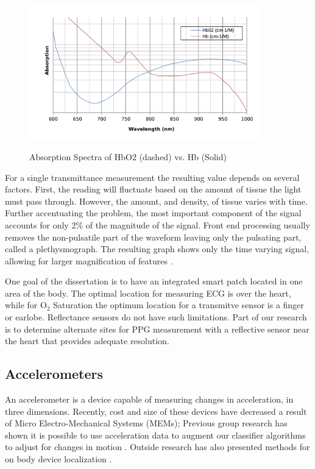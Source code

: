 \begin{figure}
	\begin{center}
		\label{fig:Hemoglobin}
		\includegraphics[scale=1,width=0.9\textwidth]{Images/hemoglobin.pdf} 
		\caption{Absorption Spectra of HbO2 (dashed) vs. Hb (Solid) }
	\end{center}
\end{figure}

For a single transmittance measurement the resulting value depends on several factors. First, the reading will fluctuate based on the amount of tissue the light must pass through. However, the amount, and density, of tissue varies with time. Further accentuating the problem, the most important component of the signal accounts for only 2\% of the magnitude of the signal. Front end processing usually removes the non-pulsatile part of the waveform leaving only the pulsating part, called a plethysmograph. The resulting graph shows only the time varying signal, allowing for larger magnification of features \cite{Jawahar2009}.

One goal of the dissertation is to have an integrated smart patch located in one area of the body. The optimal location for measuring ECG is over the heart, while for O$_2$ Saturation the optimum location for a transmitve sensor is a finger or earlobe. Reflectance sensors do not have such limitations. Part of our research is to determine alternate sites for PPG measurement with a reflective sensor near the heart that provides adequate resolution.

\subsection{Accelerometers}
\label{subsec:Accelerometers}
An accelerometer is a device capable of measuring changes in acceleration, in three dimensions. Recently, cost and size of these devices have decreased a result of Micro Electro-Mechanical Systems (MEMs);  Previous group research has shown it is possible to use acceleration data to augment our classifier algorithms to adjust for changes in motion \cite{Shannon2012}.  Outside research has also presented methods for on body device localization \cite{Vahdatpour2011}. 

